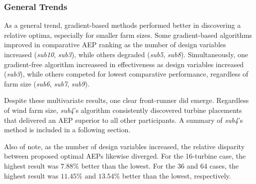 \subsubsection{General Trends}



As a general trend, gradient-based methods performed better in discovering a relative optima, especially for smaller farm sizes.
Some gradient-based algorithms improved in comparative AEP ranking as the number of design variables increased (\textit{sub10}, \textit{sub3}), while others degraded (\textit{sub5}, \textit{sub8}).
Simultaneously, one gradient-free algorithm increaseed in effectiveness as design variables increased (\textit{sub3}), while others competed for lowest comparative performance, regardless of farm size (\textit{sub6}, \textit{sub7}, \textit{sub9}).

Despite these multivariate results, one clear front-runner did emerge.
Regardless of wind farm size, \textit{sub4}'s algorithm consistently discovered turbine placements that delivered an AEP superior to all other participants.
A summary of \textit{sub4}'s method is included in a following section.

Also of note, as the number of design variables increased, the relative disparity between proposed optimal AEPs likewise diverged.
For the 16-turbine case, the highest result was $7.88\%$ better than the lowest.
For the 36 and 64 cases, the highest result was $11.45\%$ and $13.54\%$ better than the lowest, respectively.

